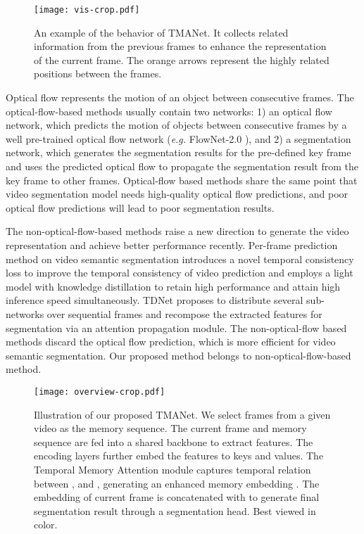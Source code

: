 \documentclass{article}
\begin{document}
	\begin{figure}[thb!]
		\begin{center}
			\texttt{[image: vis-crop.pdf]}
		\end{center}
		\vspace{-0.5cm}
		\caption{An example of the behavior of TMANet. It collects related information from the previous frames to enhance the representation of the current frame. The orange arrows represent the highly related positions between the frames.}
		\vspace{-0.5cm}
		\label{example}
	\end{figure}
	
Optical flow represents the motion of an object between consecutive frames. The optical-flow-based methods \cite{CLK2016, DFF2017, GRFP2018, LVS2018} usually contain two networks: 1) an optical flow network, which predicts the motion of objects between consecutive frames by a well pre-trained optical flow network (\emph{e.g.} FlowNet-2.0 \cite{FlowNet2.02017}), and 2) a segmentation network, which generates the segmentation results for the pre-defined key frame and  uses the predicted optical flow to propagate the segmentation result from the key frame to other frames.
Optical-flow based methods share the same point that video segmentation model needs high-quality optical flow predictions, and poor optical flow predictions will lead to poor segmentation results.
	
The non-optical-flow-based methods raise a new direction to generate the video representation and achieve better performance recently. 
Per-frame prediction method \cite{efficient2020} on video semantic segmentation introduces a novel temporal consistency loss to improve the temporal consistency of video prediction and employs a light model with knowledge distillation to retain high performance and attain high inference speed simultaneously. 
	TDNet \cite{TDNet2019} proposes to distribute several sub-networks over sequential frames and recompose the extracted features for segmentation via an attention propagation module.
	The non-optical-flow based methods discard the optical flow prediction, which is more efficient for video semantic segmentation. 
	Our proposed method  belongs to non-optical-flow-based method.
	
	\begin{figure*}[thb!]
		\begin{center}
			\texttt{[image: overview-crop.pdf]}
		\end{center}
		\vspace{-0.5cm}
		\caption{Illustration of our proposed TMANet. We select  frames from a given video as the memory sequence.  The current frame and memory sequence are fed into a shared backbone to extract features. The encoding layers further embed the features to keys and values. The Temporal Memory Attention module captures temporal relation between ,  and ,  generating an enhanced memory embedding . The embedding of current frame  is concatenated with  to generate final segmentation result through a segmentation head. Best viewed in color.}
		\vspace{-0.36cm}
		\label{overview}
	\end{figure*}
	
\end{document}
